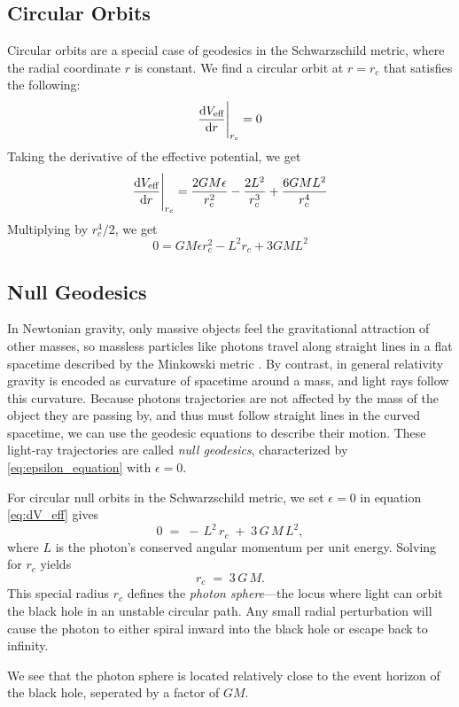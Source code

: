 \documentclass[12pt]{article}
\begin{document}
\subsection{Circular Orbits}
Circular orbits are a special case of geodesics in the Schwarzschild metric, where the radial coordinate \(r\) is constant.
We find a circular orbit at $r = r_{c}$ that satisfies the following:
\[
	\dv{V_{\text{eff}}}{r}\Bigg|_{r_{c}} = 0
\]
Taking the derivative of the effective potential, we get
\begin{equation}\label{eq:dV_eff}
	\dv{V_{\text{eff}}}{r}\Bigg|_{r_{c}} = \frac{2GM\epsilon}{r_{c}^{2}} - \frac{2L^{2}}{r_{c}^{3}} + \frac{6GM L^{2}}{r_{c}^{4}}
\end{equation}
Multiplying by $r_{c}^{4}/2$, we get
\[
	0 = GM\epsilon r_{c}^{2} - L^{2} r_{c} + 3GM L^{2}
\]

\subsection{Null Geodesics}

In Newtonian gravity, only massive objects feel the gravitational attraction of other masses, so massless particles like photons travel along straight lines in a flat spacetime described by the Minkowski metric \cite{carrol2019spacetime}.  
By contrast, in general relativity gravity is encoded as curvature of spacetime around a mass, and light rays follow this curvature.  
Because photons trajectories are not affected by the mass of the object they are passing by, and thus must follow straight lines in the curved spacetime, we can use the geodesic equations to describe their motion.
These light‐ray trajectories are called \emph{null geodesics}, characterized by \ref{eq:epsilon_equation} with \(\epsilon = 0\).

For circular null orbits in the Schwarzschild metric, we set \(\epsilon=0\) in equation \ref{eq:dV_eff} gives
\[
0 \;=\; -\,L^{2}\,r_{c} \;+\; 3\,G\,M\,L^{2},
\]
where \(L\) is the photon’s conserved angular momentum per unit energy.  
Solving for \(r_{c}\) yields
\[
r_{c} \;=\; 3\,G\,M.
\]
This special radius \(r_{c}\) defines the \emph{photon sphere}—the locus where light can orbit the black hole in an unstable circular path. 
Any small radial perturbation will cause the photon to either spiral inward into the black hole or escape back to infinity.

We see that the photon sphere is located relatively close to the event horizon of the black hole, seperated by a factor of \(GM\).
\end{document}
